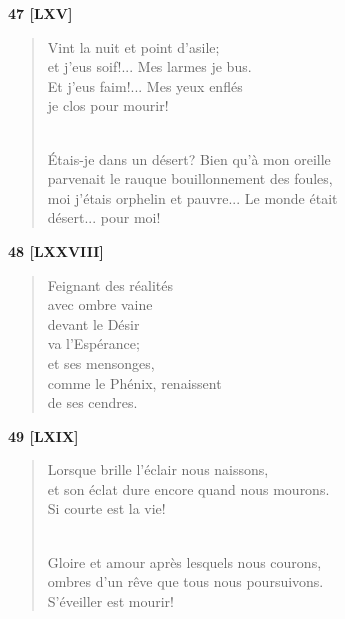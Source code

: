 \documentclass[a4paper,12pt]{book}
\begin{document}
\bigskip

\begin{center} {\bf 47 [LXV]} \end{center}

\begin{verse}
Vint la nuit et point d'asile; \\
et j'eus soif!... Mes larmes je bus. \\
Et j'eus faim!... Mes yeux enflés \\
je clos pour mourir! \\ \

Étais-je dans un désert? Bien qu'à mon oreille \\
parvenait le rauque bouillonnement des foules, \\
moi j'étais orphelin et pauvre... Le monde était \\
désert... pour moi! \\
\end{verse}

\bigskip

\begin{center} {\bf 48 [LXXVIII]} \end{center}

\begin{verse}
Feignant des réalités \\
avec ombre vaine \\
devant le Désir \\
va l'Espérance; \\
et ses mensonges, \\
comme le Phénix, renaissent \\
de ses cendres. \\
\end{verse}

\bigskip

\begin{center} {\bf 49 [LXIX]} \end{center}

\begin{verse}
Lorsque brille l'éclair nous naissons, \\
et son éclat dure encore quand nous mourons. \\
Si courte est la vie! \\ \

Gloire et amour après lesquels nous courons, \\
ombres d'un rêve que tous nous poursuivons. \\
S'éveiller est mourir! \\
\end{verse}
\end{document}
